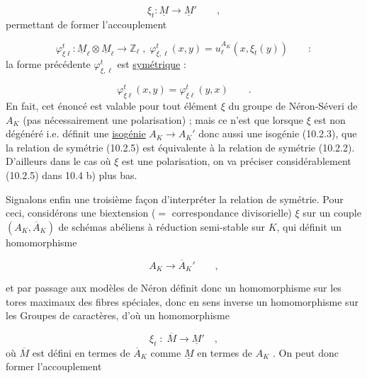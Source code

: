 \begin{equation}\tag{10.2.3}
\xi_t : \underline{M} \longrightarrow \underline{M}' \qquad ,
\end{equation}
permettant de former l'accouplement

\begin{equation}\tag{10.2.4}
\varphi^t_{\xi\ell} : \underline{M}_\ell \otimes \underline{M}_\ell \longrightarrow \mathbb{Z}_\ell \; , \; \varphi^t_{\xi,\ell}(x,y) = u_\ell^{A_K}(x,\xi_t(y)) \qquad :
\end{equation}
la forme précédente $\varphi^t_{\xi,\ell}$ est \underline{symétrique} :

\begin{equation}\tag{10.2.5}
\varphi^t_{\xi\ell}(x,y) = \varphi^t_{\xi\ell}(y,x) \qquad .
\end{equation}
En fait, cet énoncé est valable pour tout élément $\xi$ du groupe de Néron-Séveri de $A_K$ (pas nécessairement une polarisation) ; mais ce n'est que lorsque $\xi$ est non dégénéré i.e. définit une \underline{isogénie} $A_K \to A_K'$ donc aussi une isogénie (10.2.3), que la relation de symétrie (10.2.5) est équivalente à la relation de symétrie (10.2.2). D'ailleurs dans le cas où $\xi$ est une polarisation, on va préciser considérablement (10.2.5) dans 10.4 b) plus bas.

Signalons enfin une troisième façon d'interpréter la relation de symétrie. Pour ceci, considérons une biextension ($=$ correspondance divisorielle) $\xi$ sur un couple $(A_K,\overline{A}_K)$ de schémas abéliens à réduction semi-stable sur $K$, qui définit un homomorphisme

\begin{equation*}
A_K \longrightarrow \overline{A}_K' \qquad ,
\end{equation*}


et par passage aux modèles de Néron définit donc un homomorphisme sur les tores maximaux des fibres spéciales, donc en sens inverse un homomorphisme sur les Groupes de caractères, d'où un homomorphisme

\begin{equation}\tag{10.2.6}
\xi_t \; : \; \overline{M} \longrightarrow \underline{M}' \quad ,
\end{equation}
où $\overline{M}$ est défini en termes de $\overline{A}_K$ comme $\underline{M}$ en termes de $A_K$ . On peut donc former l'accouplement

